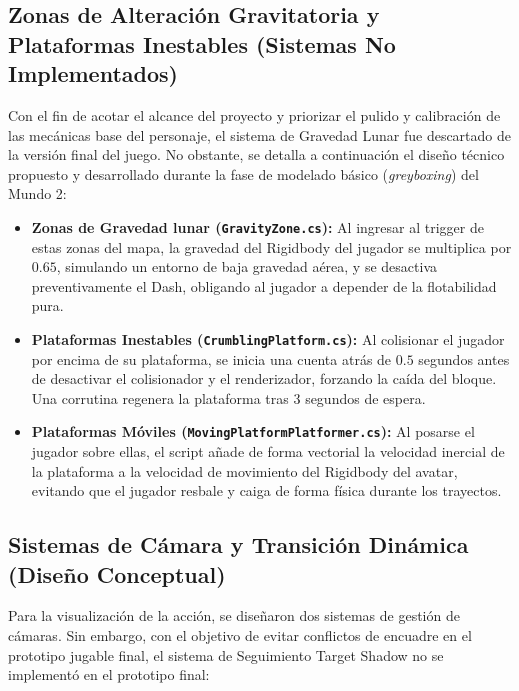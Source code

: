 \subsection{Zonas de Alteración Gravitatoria y Plataformas Inestables (Sistemas No Implementados)}
Con el fin de acotar el alcance del proyecto y priorizar el pulido y calibración de las mecánicas base del personaje, el sistema de Gravedad Lunar fue descartado de la versión final del juego. No obstante, se detalla a continuación el diseño técnico propuesto y desarrollado durante la fase de modelado básico (\textit{greyboxing}) del Mundo 2:

\begin{itemize}
    \item \textbf{Zonas de Gravedad lunar (\texttt{GravityZone.cs}):} Al ingresar al trigger de estas zonas del mapa, la gravedad del Rigidbody del jugador se multiplica por $0.65$, simulando un entorno de baja gravedad aérea, y se desactiva preventivamente el Dash, obligando al jugador a depender de la flotabilidad pura.
    \item \textbf{Plataformas Inestables (\texttt{CrumblingPlatform.cs}):} Al colisionar el jugador por encima de su plataforma, se inicia una cuenta atrás de $0.5$ segundos antes de desactivar el colisionador y el renderizador, forzando la caída del bloque. Una corrutina regenera la plataforma tras $3$ segundos de espera.
    \item \textbf{Plataformas Móviles (\texttt{MovingPlatformPlatformer.cs}):} Al posarse el jugador sobre ellas, el script añade de forma vectorial la velocidad inercial de la plataforma a la velocidad de movimiento del Rigidbody del avatar, evitando que el jugador resbale y caiga de forma física durante los trayectos.
\end{itemize}

\subsection{Sistemas de Cámara y Transición Dinámica (Diseño Conceptual)}
Para la visualización de la acción, se diseñaron dos sistemas de gestión de cámaras. Sin embargo, con el objetivo de evitar conflictos de encuadre en el prototipo jugable final, el sistema de Seguimiento Target Shadow no se implementó en el prototipo final:

